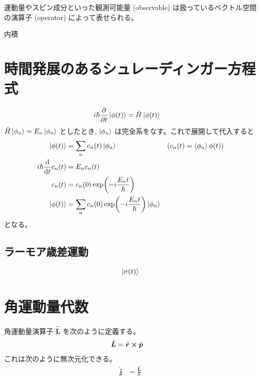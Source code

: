 \documentclass[uplatex,dvipdfmx,a4paper,11pt]{jlreq}
\newcommand{\rr}{\bm{r}}
\newcommand{\pp}{\bm{p}}
\theoremstyle{definition}
\begin{document}
\begin{definition}
  運動量やスピン成分といった観測可能量 (observable) は扱っているベクトル空間の演算子 (operator) によって表せられる。
\end{definition}

内積

\section{時間発展のあるシュレーディンガー方程式}
\begin{align}
  i\hbar\pdv{t}\ket{\phi(t)} & = \hat{H}\ket{\phi(t)}
\end{align}
$\hat{H}\ket{\phi_n} = E_n\ket{\phi_n}$ としたとき, $\ket{\phi_n}$ は完全系をなす。これで展開して代入すると
\begin{align}
  \ket{\phi(t)}      & = \sum_nc_n(t)\ket{\phi_n}                           & \qty(c_n(t) = \braket{\phi_n}{\phi(t)}) \\
  i\hbar\dv{t}c_n(t) & = E_nc_n(t)                                                                                    \\
  c_n(t)             & = c_n(0)\exp(-i\frac{E_nt}{\hbar})                                                             \\
  \ket{\phi(t)}      & = \sum_nc_n(0)\exp(-i\frac{E_nt}{\hbar})\ket{\phi_n}
\end{align}
となる。


\subsection{ラーモア歳差運動}
\begin{align}
  \ket{\sigma(t)}
\end{align}



\section{角運動量代数}
\begin{definition}
  角運動量演算子 $\hat{\bm{L}}$ を次のように定義する。
  \begin{align}
    \hat{\bm{L}} & = \hat{\rr}\cross\hat{\pp}
  \end{align}
  これは次のように無次元化できる。
  \begin{align}
    \hat{\bm{j}} & = \frac{\hat{\bm{L}}}{\hbar}
  \end{align}
\end{definition}
\end{document}
